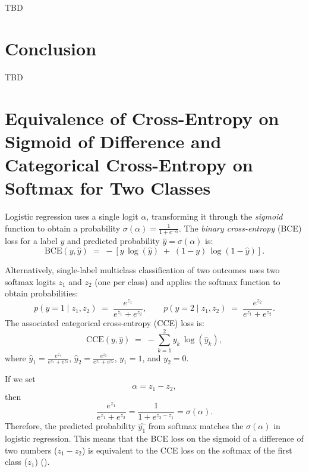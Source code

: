 \documentclass[twoside,11pt]{article}
\begin{document}
TBD

\section{Conclusion}

TBD




\newpage

\appendix



\section{Equivalence of Cross-Entropy on Sigmoid of Difference
and Categorical Cross-Entropy on Softmax for Two Classes}

\label{app:ce-of-diff-same-as-softmax}

Logistic regression uses 
a single logit \(\alpha\), transforming it through the \emph{sigmoid} function to obtain 
a probability \(\sigma(\alpha) = \frac{1}{1 + e^{-\alpha}} \). The \emph{binary cross-entropy} 
(BCE) loss for a label $y$ and predicted probability \(\hat{y} = \sigma(\alpha)\) is:
\[
  \text{BCE}(y, \hat{y})
  \;=\;
  - \left[
      y \,\log(\hat{y})
      \;+\;
      (1 - y)\,\log (1 - \hat{y})
    \right].
\]

Alternatively, single-label multiclass classification of two 
outcomes uses two softmax logits \(z_1\) and \(z_2\) (one per class) 
and applies the softmax function to obtain probabilities:
\[
  p(y=1 \mid z_1, z_2)
  \;=\;
  \frac{e^{z_1}}{e^{z_1} + e^{z_2}},
  \qquad
  p(y=2 \mid z_1, z_2)
  \;=\;
  \frac{e^{z_2}}{e^{z_1} + e^{z_2}}.
\]
The associated categorical cross-entropy (CCE) loss is: 
\[
  \text{CCE}(y, \hat{y})
  \;=\;
  -\sum_{k=1}^2 y_k \,\log (\hat{y}_k ),
\]
where \(\hat{y}_1 = \frac{e^{z_1}}{e^{z_1} + e^{z_2}}\), 
\(\hat{y}_2 = \frac{e^{z_2}}{e^{z_1} + e^{z_2}}\), 
\(y_1 = 1\), and
\(y_2 = 0\). 

If we set 
\[
  \alpha = z_1 - z_2,
\]
then
\[
  \frac{e^{z_1}}{e^{z_1} + e^{z_2}}
  =
  \frac{1}{1 + e^{z_2 - z_1}}
  =
  \sigma(\alpha).
\] 
Therefore, the predicted probability $\hat{y_1}$ from softmax
matches the \(\sigma(\alpha)\) in logistic regression. This means that 
the BCE loss on the sigmoid of a difference of two numbers ($z_1 - z_2$) 
is equivalent
to the CCE loss on the softmax of the first class
($z_1$) (\cite{Goodfellow-et-al-2016}).
\end{document}
